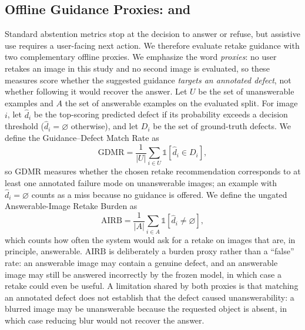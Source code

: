 \documentclass{ieeeaccess}
\newcommand{\arr}{\mathrm{GDMR}}
\newcommand{\frr}{\mathrm{AIRB}}
\begin{document}
\subsection{Offline Guidance Proxies: \arr{} and \frr{}}
\label{sec:guidance_metrics}
Standard abstention metrics stop at the decision to answer or refuse, but assistive use requires a user-facing next action. We therefore evaluate retake guidance with two complementary offline proxies. We emphasize the word \emph{proxies}: no user retakes an image in this study and no second image is evaluated, so these measures score whether the suggested guidance \emph{targets an annotated defect}, not whether following it would recover the answer. Let $U$ be the set of unanswerable examples and $A$ the set of answerable examples on the evaluated split. For image $i$, let $\hat{d}_i$ be the top-scoring predicted defect if its probability exceeds a decision threshold ($\hat{d}_i=\varnothing$ otherwise), and let $D_i$ be the set of ground-truth defects. We define the Guidance--Defect Match Rate as
\begin{equation}
\arr = \frac{1}{|U|}\sum_{i \in U} \mathbb{1}\!\left[\hat{d}_i \in D_i\right],
\end{equation}
so $\arr$ measures whether the chosen retake recommendation corresponds to at least one annotated failure mode on unanswerable images; an example with $\hat{d}_i=\varnothing$ counts as a miss because no guidance is offered. We define the ungated Answerable-Image Retake Burden as
\begin{equation}
\frr = \frac{1}{|A|}\sum_{i \in A} \mathbb{1}\!\left[\hat{d}_i \neq \varnothing\right],
\end{equation}
which counts how often the system would ask for a retake on images that are, in principle, answerable. $\frr$ is deliberately a burden proxy rather than a ``false'' rate: an answerable image may contain a genuine defect, and an answerable image may still be answered incorrectly by the frozen model, in which case a retake could even be useful. A limitation shared by both proxies is that matching an annotated defect does not establish that the defect caused unanswerability: a blurred image may be unanswerable because the requested object is absent, in which case reducing blur would not recover the answer.
\end{document}
